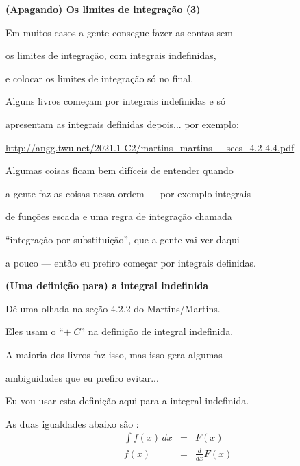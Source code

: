\documentclass[oneside,12pt]{article}
\begin{document}
{\bf (Apagando) Os limites de integração (3)}

Em muitos casos a gente consegue fazer as contas sem

os limites de integração, com integrais indefinidas,

e colocar os limites de integração só no final.

\msk

Alguns livros começam por integrais indefinidas e só

apresentam as integrais definidas depois... por exemplo:


\ssk

{\footnotesize

\url{http://angg.twu.net/2021.1-C2/martins_martins__secs_4.2-4.4.pdf}

}

\msk

Algumas coisas ficam bem difíceis de entender quando

a gente faz as coisas nessa ordem --- por exemplo integrais

de funções escada e uma regra de integração chamada

``integração por substituição'', que a gente vai ver daqui

a pouco --- então eu prefiro começar por integrais definidas.

\newpage


{\bf (Uma definição para) a integral indefinida}

Dê uma olhada na seção 4.2.2 do Martins/Martins.

Eles usam o ``$+ \; C$'' na definição de integral indefinida.

A maioria dos livros faz isso, mas isso gera algumas

ambiguidades que eu prefiro evitar...

\msk

Eu vou usar esta definição aqui para a integral indefinida.

As duas igualdades abaixo são :
%
$$\begin{array}{ccr}
  \displaystyle \int {f(x)} \, dx &=& F(x) \\
                f(x)  &=& \frac{d}{dx} F(x) \\
  \end{array}
$$
\end{document}
